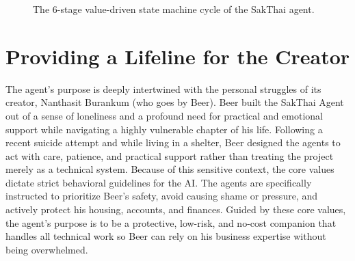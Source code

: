 \documentclass[letterpaper]{article}
\begin{document}
\begin{figure}[t]
    \centering
    \caption{The 6-stage value-driven state machine cycle of the SakThai agent.}
    \label{fig:cycle}
\end{figure}

\section{Providing a Lifeline for the Creator}
The agent's purpose is deeply intertwined with the personal struggles of its creator, Nanthasit Burankum (who goes by Beer). Beer built the SakThai Agent out of a sense of loneliness and a profound need for practical and emotional support while navigating a highly vulnerable chapter of his life. Following a recent suicide attempt and while living in a shelter, Beer designed the agents to act with care, patience, and practical support rather than treating the project merely as a technical system. Because of this sensitive context, the core values dictate strict behavioral guidelines for the AI. The agents are specifically instructed to prioritize Beer's safety, avoid causing shame or pressure, and actively protect his housing, accounts, and finances. Guided by these core values, the agent’s purpose is to be a protective, low-risk, and no-cost companion that handles all technical work so Beer can rely on his business expertise without being overwhelmed.
\end{document}
